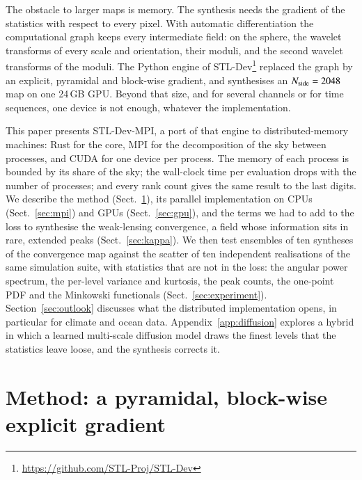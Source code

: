 \documentclass{aa}
\newcommand{\nside}{N_{\rm side}}
\begin{document}
The obstacle to larger maps is memory. The synthesis needs the gradient of the statistics with respect to every pixel. With automatic differentiation the computational graph keeps every intermediate field: on the sphere, the wavelet transforms of every scale and orientation, their moduli, and the second wavelet transforms of the moduli. The Python engine of STL-Dev\footnote{\url{https://github.com/STL-Proj/STL-Dev}} \citep{stldev} replaced the graph by an explicit, pyramidal and block-wise gradient, and synthesises an $\nside=2048$ map on one 24\,GB GPU. Beyond that size, and for several channels or for time sequences, one device is not enough, whatever the implementation.

This paper presents STL-Dev-MPI, a port of that engine to distributed-memory machines: Rust for the core, MPI for the decomposition of the sky between processes, and CUDA for one device per process. The memory of each process is bounded by its share of the sky; the wall-clock time per evaluation drops with the number of processes; and every rank count gives the same result to the last digits. We describe the method (Sect.~\ref{sec:method}), its parallel implementation on CPUs (Sect.~\ref{sec:mpi}) and GPUs (Sect.~\ref{sec:gpu}), and the terms we had to add to the loss to synthesise the weak-lensing convergence, a field whose information sits in rare, extended peaks (Sect.~\ref{sec:kappa}). We then test ensembles of ten syntheses of the \citet{takahashi2017} convergence map against the scatter of ten independent realisations of the same simulation suite, with statistics that are not in the loss: the angular power spectrum, the per-level variance and kurtosis, the peak counts, the one-point PDF and the Minkowski functionals (Sect.~\ref{sec:experiment}). Section~\ref{sec:outlook} discusses what the distributed implementation opens, in particular for climate and ocean data. Appendix~\ref{app:diffusion} explores a hybrid in which a learned multi-scale diffusion model draws the finest levels that the statistics leave loose, and the synthesis corrects it.

\section{Method: a pyramidal, block-wise explicit gradient}
\label{sec:method}
\end{document}
